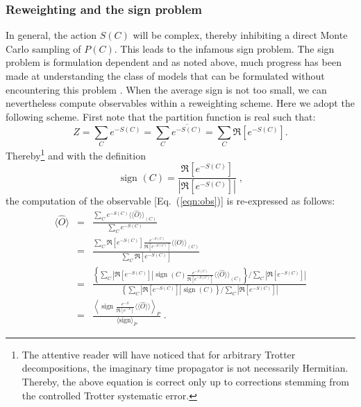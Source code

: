 \documentclass{SciPost}
\begin{document}
\subsubsection{Reweighting and the sign problem}\label{sec:reweight}
%
In general, the action  $S(C) $ will be complex, thereby inhibiting a direct Monte Carlo sampling of $P(C)$.   This leads to the infamous sign problem.     The sign problem is formulation dependent and as noted above, much progress has been made at understanding the class of models that  can be formulated without encountering this problem 
\cite{Wu04,Huffman14,Yao14a,Wei16}.  When the average sign is not too small, we can nevertheless  compute observables within a reweighting scheme.   Here we adopt the following scheme. First  note  that the partition function is real such that: 
\begin{equation}
	Z =   \sum_{C}  e^{-S(C)}    =  \sum_{C}  \overline{e^{-S(C)}} = \sum_{C}  \Re \left[e^{-S(C)} \right]. 
\end{equation}
Thereby\footnote{The attentive reader will have noticed that   for arbitrary Trotter decompositions,  the  imaginary time propagator is not necessarily Hermitian. Thereby, the above equation is correct only up to corrections stemming from the  controlled Trotter systematic error. }
and with the definition
\begin{equation}
\label{Sign.eq}
	 \text{ sign }(C)   =  \frac{   \Re \left[e^{-S(C)} \right]  } {\left| \Re \left[e^{-S(C)} \right]  \right|  }\;,
\end{equation}
the computation of the observable [Eq.~(\ref{eqn:obs})] is re-expressed as follows:
\begin{eqnarray}\label{eqn:obs_rw}
\langle \hat{O}  \rangle  &=&  \frac{\sum_{C}  e^{-S(C)} \langle \langle \hat{O}  \rangle \rangle_{(C)} }{\sum_{C}  e^{-S(C)}}       \nonumber \\ 
                          &=&  \frac{\sum_{C}   \Re \left[e^{-S(C)} \right]    \frac{e^{-S(C)}} {\Re \left[e^{-S(C)} \right]}  \langle \langle \hat{O}  \rangle \rangle_{(C)} }{\sum_{C}   \Re \left[e^{-S(C)} \right]}    \nonumber \\ 
          &=&
   \frac{
     \left\{
      \sum_{C}  \left| \Re \left[e^{-S(C)} \right]  \right|   \text{ sign }(C)   \frac{e^{-S(C)}} {\Re \left[e^{-S(C)} \right]}  \langle \langle \hat{O}  \rangle \rangle_{(C)}  \right\}/
            \sum_{C}  \left| \Re \left[ e^{-S(C)} \right] \right|  
          }  
          { 
          \left\{ \sum_{C}  \left|  \Re \left[ e^{-S(C)} \right]   \right|   \text{ sign }(C) \right\}/
            \sum_{C}   \left| \Re \left[ e^{-S(C)} \right] \right|  
          } \nonumber\\
          &=&
  	 \frac{  \left\langle  \text{ sign }   \frac{e^{-S}} {\Re \left[e^{-S} \right]}  \langle \langle \hat{O}  \rangle \rangle  \right\rangle_{\overline{P}} } { \langle \text{sign}   \rangle_{\overline{P}}}  \;.      
\end{eqnarray} 
\end{document}
